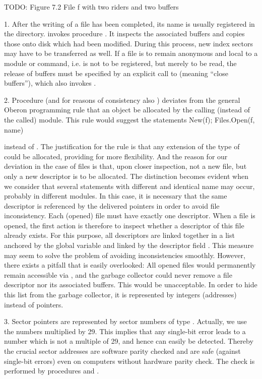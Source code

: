 TODO: Figure 7.2 File f with two riders and two buffers

1. After the writing of a file has been completed, its name is usually registered in the directory.  invokes procedure . It inspects the associated buffers and copies those onto disk which had been modified. During this process, new index sectors may have to be transferred as well. If a file is to remain anonymous and local to a module or command, i.e. is not to be registered, but merely to be read, the release of buffers must be specified by an explicit call to  (meaning ``close buffers''), which also invokes .

2. Procedure  (and for reasons of consistency also ) deviates from the general Oberon programming rule that an object be allocated by the calling (instead of the called) module. This rule would suggest the statements
\begintt
New(f); Files.Open(f, name)
\endtt

\noindent instead of . The justification for the rule is that any extension of the type of  could be allocated, providing for more flexibility. And the reason for our deviation in the case of files is that, upon closer inspection, not a new file, but only a new descriptor is to be allocated. The distinction becomes evident when we consider that several statements  with different  and identical name may occur, probably in different modules. In this case, it is necessary that the same descriptor is referenced by the delivered pointers in order to avoid file inconsistency. Each (opened) file must have exactly one descriptor. When a file is opened, the first action is therefore to inspect whether a descriptor of this file already exists. For this purpose, all descriptors are linked together in a list anchored by the global variable  and linked by the descriptor field . This measure may seem to solve the problem of avoiding inconsistencies smoothly. However, there exists a pitfall that is easily overlooked: All opened files would permanently remain accessible via , and the garbage collector could never remove a file descriptor nor its associated buffers. This would be unacceptable. In order to hide this list from the garbage collector, it is represented by integers (addresses) instead of pointers.

3. Sector pointers are represented by sector numbers of type . Actually, we use the numbers multiplied by 29. This implies that any single-bit error leads to a number which is not a multiple of 29, and hence can easily be detected. Thereby the crucial sector addresses are software parity checked and are safe (against single-bit errors) even on computers without hardware parity check. The check is performed by procedures  and .

